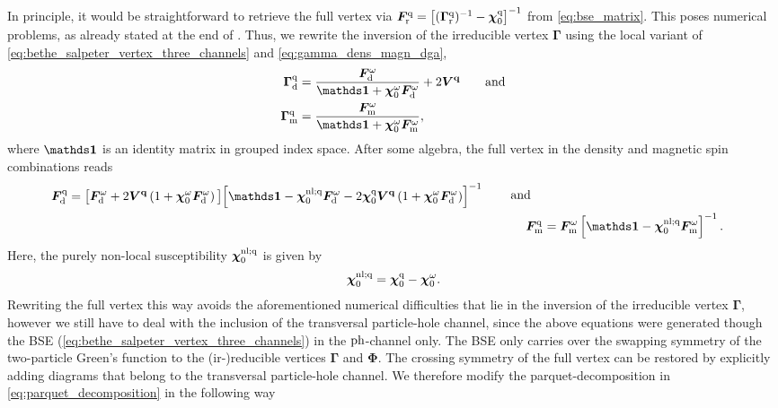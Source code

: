 \documentclass[\main/main.tex]{subfiles}
\begin{document}
In principle, it would be straightforward to retrieve the full vertex via $\bm F_{\text{r}}^{\text{q}}=\left [(\bm\Gamma_{\text{r}}^{\text{q}})^{-1}-\bm\chi_{0}^{\text{q}}\right ]^{-1}$ from \eqref{eq:bse_matrix}. This poses numerical problems, as already stated at the end of . Thus, we rewrite the inversion of the irreducible vertex $\bm\Gamma$ using the local variant of \eqref{eq:bethe_salpeter_vertex_three_channels} and \eqref{eq:gamma_dens_magn_dga},
\begin{subequations}
\begin{align}
	\bm\Gamma_{\dens}^{\q}&=\frac{\bm F_{\dens}^{\omega}}{\bm\unity+\bm\chi_{0}^{\omega}\bm F_{\dens}^{\omega}}+2\bm V^{\vv{q}}\qqand\\
	\bm\Gamma_{\magn}^{\q}&=\frac{\bm F_{\magn}^{\omega}}{\bm\unity+\bm\chi_{0}^{\omega}\bm F_{\magn}^{\omega}},
\end{align}
\end{subequations}
where $\bm\unity$ is an identity matrix in grouped index space. After some algebra, the full vertex in the density and magnetic spin combinations reads
\begin{subequations}
\begin{align}
\begin{split}
	\bm F_{\dens}^{\q}&=\big [\bm F_{\dens}^{\omega}+2\bm V^{\vv{q}}\left (1+\bm\chi_{0}^{\omega}\bm F_{\dens}^{\omega}\right )\big ]\!\left [\bm\unity-\bm\chi_{0}^{\nl;\q}\bm F_{\dens}^{\omega}-2\bm\chi_{0}^{\q}\bm V^{\vv{q}}\left (1+\bm\chi_{0}^{\omega}\bm F_{\dens}^{\omega}\right )\right ]^{-1}
\end{split}\;\quad\text{and}\quad\\
	\bm F_{\magn}^{\q}&=\bm F_{\magn}^{\omega}\left [\bm\unity-\bm\chi_{0}^{\nl;\q}\bm F_{\magn}^{\omega}\right ]^{-1}.
\end{align}
\end{subequations}
Here, the purely non-local susceptibility $\bm\chi_{0}^{\text{nl};\text{q}}$ is given by
\begin{align}
	\bm\chi_{0}^{\text{nl};\text{q}}=\bm\chi_{0}^{\text{q}}-\bm\chi_{0}^{\omega}.
\end{align}
Rewriting the full vertex this way avoids the aforementioned numerical difficulties that lie in the inversion of the irreducible vertex $\bm\Gamma$, however we still have to deal with the inclusion of the transversal particle-hole channel, since the above equations were generated though the BSE (\ref{eq:bethe_salpeter_vertex_three_channels}) in the $\text{ph}$-channel only. The BSE only carries over the swapping symmetry of the two-particle Green's function to the (ir-)reducible vertices $\bm\Gamma$ and $\bm\Phi$. The crossing symmetry of the full vertex can be restored by explicitly adding diagrams that belong to the transversal particle-hole channel. We therefore modify the parquet-decomposition in \eqref{eq:parquet_decomposition} in the following way
\end{document}
